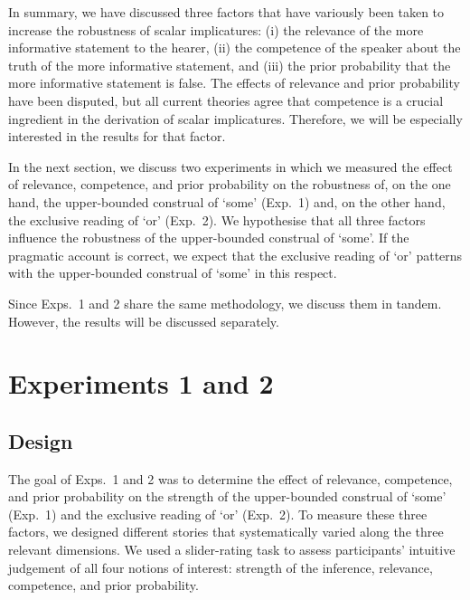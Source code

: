 \documentclass[12pt]{article}
\begin{document}
In summary, we have discussed three factors that have variously been taken to increase the
robustness of scalar implicatures: (i) the relevance of the more informative statement to the
hearer, (ii) the competence of the speaker about the truth of the more informative statement,
and (iii) the prior probability that the more informative statement is false.  The
effects of relevance and prior probability have been disputed, but all current theories agree
that competence is a crucial ingredient in the derivation of scalar implicatures. Therefore, we
will be especially interested in the results for that factor.

In the next section, we discuss two experiments in which we measured the effect of relevance, competence, and prior probability on the robustness of, on the one hand, the upper-bounded construal of `some' (Exp.\ 1) and, on the other hand, the exclusive reading of `or' (Exp.\ 2). We hypothesise that all three factors influence the robustness of the upper-bounded construal of `some'. If the pragmatic account is correct, we expect that the exclusive reading of `or' patterns with the upper-bounded construal of `some' in this respect.

Since Exps.\ 1 and 2 share the same methodology, we discuss them in tandem. However, the results will be discussed separately.

\section{Experiments 1 and 2}
\subsection*{Design}

The goal of Exps.\ 1 and 2 was to determine the effect of relevance, competence, and prior probability on the strength of the upper-bounded construal of `some' (Exp.\ 1) and the exclusive reading of `or' (Exp.\ 2). To measure these three factors, we designed different stories that systematically varied along the three relevant dimensions. We used a slider-rating task to assess participants' intuitive judgement of all four notions of interest: strength of the inference, relevance, competence, and prior probability.
\end{document}
